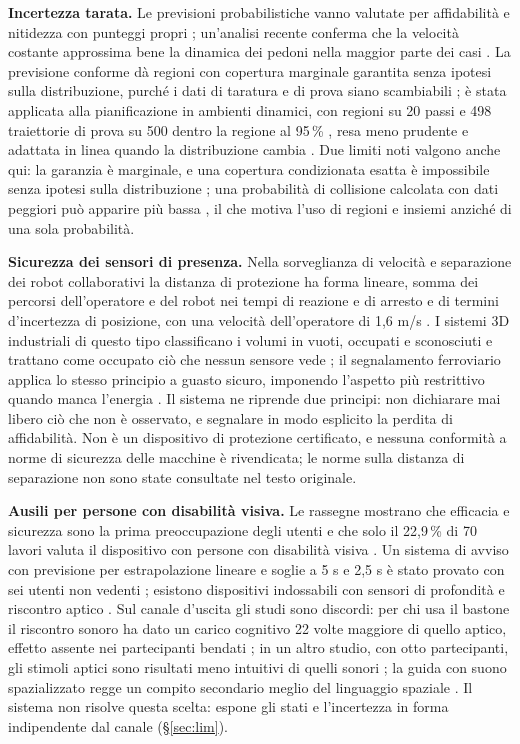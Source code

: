 \textbf{Incertezza tarata.} Le previsioni probabilistiche vanno valutate per affidabilità e nitidezza \cite{kress2021} con punteggi propri \cite{gneiting2007}; un'analisi recente conferma che la velocità costante approssima bene la dinamica dei pedoni nella maggior parte dei casi \cite{uhlemann2024}. La previsione conforme dà regioni con copertura marginale garantita senza ipotesi sulla distribuzione, purché i dati di taratura e di prova siano scambiabili \cite{angelopoulos2021}; è stata applicata alla pianificazione in ambienti dinamici, con regioni su 20 passi e 498 traiettorie di prova su 500 dentro la regione al 95\,\% \cite{lindemann2023}, resa meno prudente \cite{cleaveland2024} e adattata in linea quando la distribuzione cambia \cite{gibbs2021,dixit2022}. Due limiti noti valgono anche qui: la garanzia è marginale, e una copertura condizionata esatta è impossibile senza ipotesi sulla distribuzione \cite{barber2019}; una probabilità di collisione calcolata con dati peggiori può apparire più bassa \cite{balch2019}, il che motiva l'uso di regioni e insiemi anziché di una sola probabilità.

\textbf{Sicurezza dei sensori di presenza.} Nella sorveglianza di velocità e separazione dei robot collaborativi la distanza di protezione ha forma lineare, somma dei percorsi dell'operatore e del robot nei tempi di reazione e di arresto e di termini d'incertezza di posizione, con una velocità dell'operatore di 1,6 m/s \cite{marvel2017}. I sistemi 3D industriali di questo tipo classificano i volumi in vuoti, occupati e sconosciuti e trattano come occupato ciò che nessun sensore vede \cite{therobotreport-veo,us-brevetto-11846916}; il segnalamento ferroviario applica lo stesso principio a guasto sicuro, imponendo l'aspetto più restrittivo quando manca l'energia \cite{us-49cfr-236-205}. Il sistema ne riprende due principi: non dichiarare mai libero ciò che non è osservato, e segnalare in modo esplicito la perdita di affidabilità. Non è un dispositivo di protezione certificato, e nessuna conformità a norme di sicurezza delle macchine è rivendicata; le norme sulla distanza di separazione non sono state consultate nel testo originale.

\textbf{Ausili per persone con disabilità visiva.} Le rassegne mostrano che efficacia e sicurezza sono la prima preoccupazione degli utenti \cite{xu2023} e che solo il 22,9\,\% di 70 lavori valuta il dispositivo con persone con disabilità visiva \cite{romlay2021}. Un sistema di avviso con previsione per estrapolazione lineare e soglie a 5 s e 2,5 s è stato provato con sei utenti non vedenti \cite{kayukawa2019}; esistono dispositivi indossabili con sensori di profondità e riscontro aptico \cite{dossantos2025,kozlov2026}. Sul canale d'uscita gli studi sono discordi: per chi usa il bastone il riscontro sonoro ha dato un carico cognitivo 22 volte maggiore di quello aptico, effetto assente nei partecipanti bendati \cite{martinez2014}; in un altro studio, con otto partecipanti, gli stimoli aptici sono risultati meno intuitivi di quelli sonori \cite{lupu2020}; la guida con suono spazializzato regge un compito secondario meglio del linguaggio spaziale \cite{giudice2008}. Il sistema non risolve questa scelta: espone gli stati e l'incertezza in forma indipendente dal canale (\S\ref{sec:lim}).
